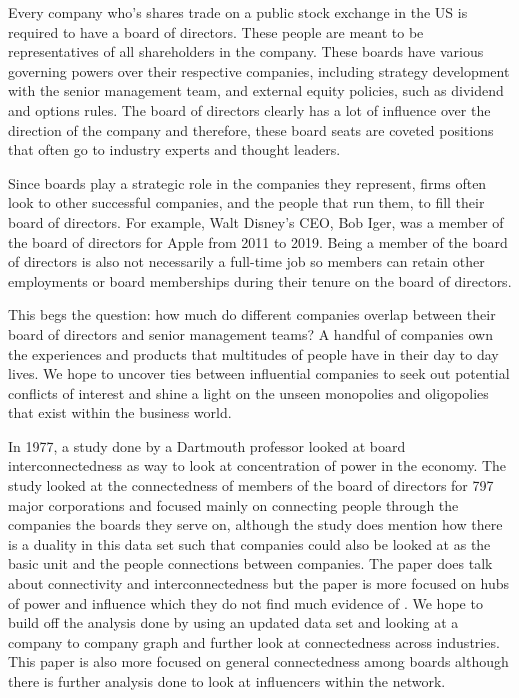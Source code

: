 \documentclass[a4paper]{article}
\begin{document}
Every company who's shares trade on a public stock exchange in the US is required to have a board of directors. These people are meant to be representatives of all shareholders in the company. These boards have various governing powers over their respective companies, including strategy development with the senior management team, and external equity policies, such as dividend and options rules. The board of directors clearly has a lot of influence over the direction of the company and therefore, these board seats are coveted positions that often go to industry experts and thought leaders.
\par
Since boards play a strategic role in the companies they represent, firms often look to other successful companies, and the people that run them, to fill their board of directors. For example, Walt Disney's CEO, Bob Iger, was a member of the board of directors for Apple from 2011 to 2019. Being a member of the board of directors is also not necessarily a full-time job so members can retain other employments or board memberships during their tenure on the board of directors. 
\par
This begs the question: how much do different companies overlap between their board of directors and senior management teams? A handful of companies own the experiences and products that multitudes of people have in their day to day lives. We hope to uncover ties between influential companies to seek out potential conflicts of interest and shine a light on the unseen monopolies and oligopolies that exist within the business world.
\par
In 1977, a study done by a Dartmouth professor looked at board interconnectedness as way to look at concentration of power in the economy. The study looked at the connectedness of members of the board of directors for 797 major corporations and focused mainly on connecting people through the companies the boards they serve on, although the study does mention how there is a duality in this data set such that companies could also be looked at as the basic unit and the people connections between companies. The paper does talk about connectivity and interconnectedness but the paper is more focused on hubs of power and influence which they do not find much evidence of \cite{levine}. We hope to build off the analysis done by using an updated data set and looking at a company to company graph and further look at connectedness across industries. This paper is also more focused on general connectedness among boards although there is further analysis done to look at influencers within the network.
\end{document}
